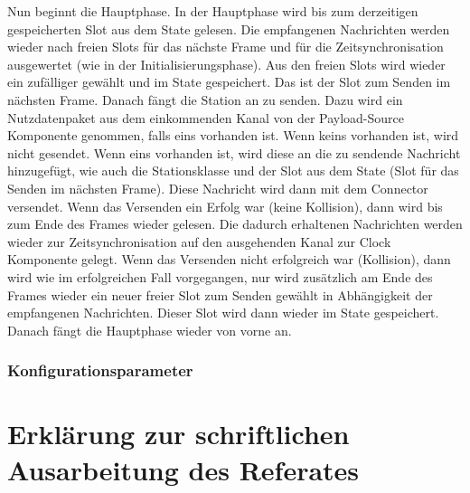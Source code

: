 \documentclass[draft=false
              ,paper=a4
              ,twoside=false
              ,fontsize=11pt
              ,headsepline
              ,BCOR10mm
              ,DIV11
              ]{scrbook}
\begin{document}
Nun beginnt die Hauptphase. In der Hauptphase wird bis zum derzeitigen gespeicherten Slot aus dem State gelesen. Die empfangenen Nachrichten werden wieder nach freien Slots für das nächste Frame und für die Zeitsynchronisation ausgewertet (wie in der Initialisierungsphase). Aus den freien Slots wird wieder ein zufälliger gewählt und im State gespeichert. Das ist der Slot zum Senden im nächsten Frame.
Danach fängt die Station an zu senden. Dazu wird ein Nutzdatenpaket aus dem einkommenden Kanal von der Payload-Source Komponente genommen, falls eins vorhanden ist. Wenn keins vorhanden ist, wird nicht gesendet.
Wenn eins vorhanden ist, wird diese an die zu sendende Nachricht hinzugefügt, wie auch die Stationsklasse und der Slot aus dem State (Slot für das Senden im nächsten Frame).
Diese Nachricht wird dann mit dem Connector versendet.
Wenn das Versenden ein Erfolg war (keine Kollision), dann wird bis zum Ende des Frames wieder gelesen. Die dadurch erhaltenen Nachrichten werden wieder zur Zeitsynchronisation auf den ausgehenden Kanal zur Clock Komponente gelegt.
Wenn das Versenden nicht erfolgreich war (Kollision), dann wird wie im erfolgreichen Fall vorgegangen, nur wird zusätzlich am Ende des Frames wieder ein neuer freier Slot zum Senden gewählt in Abhängigkeit der empfangenen Nachrichten. Dieser Slot wird dann wieder im State gespeichert.
Danach fängt die Hauptphase wieder von vorne an.

\subsection{Konfigurationsparameter}



\backmatter




\renewcommand{\nomname}{Glossar}
\clearpage
\markboth{\nomname}{\nomname} %
\printnomenclature

\printindex
\chapter{Erklärung zur schriftlichen Ausarbeitung des Referates}
\HAWasurency
\end{document}
